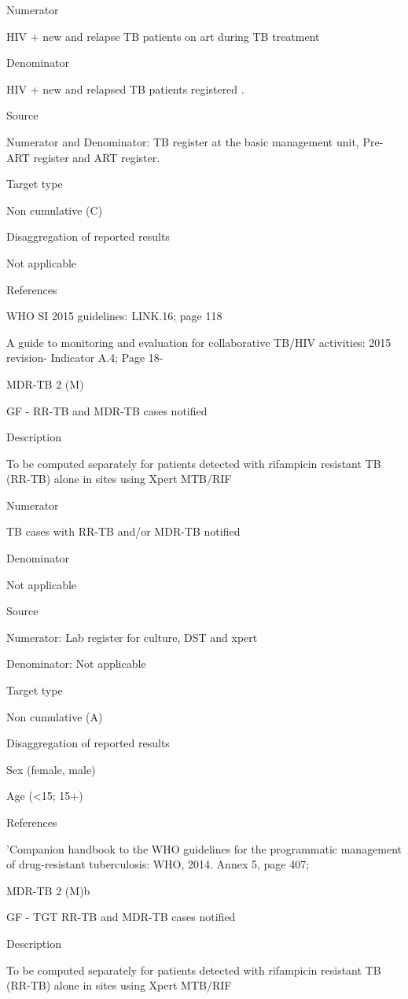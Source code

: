 \documentclass[]{book}
\begin{document}
Numerator

HIV + new and relapse TB patients on art during TB treatment

Denominator

HIV + new and relapsed TB patients registered .

Source

Numerator and
Denominator: TB register at the basic management unit, Pre-ART register and ART register.

Target type

Non cumulative (C)

Disaggregation of reported results

Not applicable

References

WHO SI 2015 guidelines: LINK.16; page 118

A guide to monitoring and evaluation for collaborative TB/HIV activities: 2015 revision- Indicator A.4; Page 18-

MDR-TB 2 (M)

GF - RR-TB and MDR-TB cases notified

Description

To be computed separately for patients detected with rifampicin resistant TB (RR-TB) alone in sites using Xpert MTB/RIF

Numerator

TB cases with RR-TB and/or MDR-TB notified

Denominator

Not applicable

Source

Numerator: Lab register for culture, DST and xpert

Denominator: Not applicable

Target type

Non cumulative (A)

Disaggregation of reported results

Sex (female, male)

Age (\textless{}15; 15+)

References

'Companion handbook to the WHO guidelines for the programmatic management of drug-resistant tuberculosis: WHO, 2014. Annex 5, page 407;

MDR-TB 2 (M)b

GF - TGT RR-TB and MDR-TB cases notified

Description

To be computed separately for patients detected with rifampicin resistant TB (RR-TB) alone in sites using Xpert MTB/RIF
\end{document}
